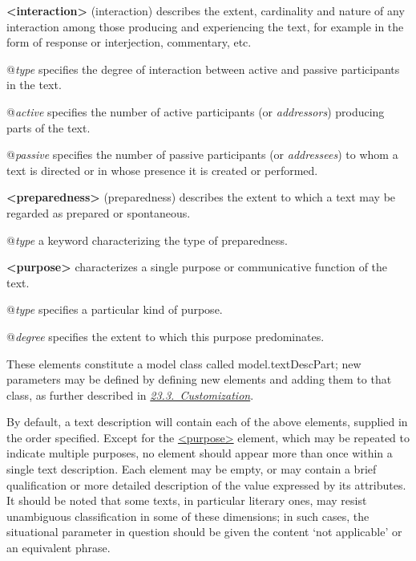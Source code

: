 \begin{sansreflist}
\item [\textbf{<interaction>}] (interaction) describes the extent, cardinality and nature of any interaction among those producing and experiencing the text, for example in the form of response or interjection, commentary, etc.\hfil\\[-10pt]\begin{sansreflist}
    \item[@{\itshape type}]
  specifies the degree of interaction between active and passive participants in the text.
    \item[@{\itshape active}]
  specifies the number of active participants (or \textit{addressors}) producing parts of the text.
    \item[@{\itshape passive}]
  specifies the number of passive participants (or \textit{addressees}) to whom a text is directed or in whose presence it is created or performed.
\end{sansreflist}  
\item [\textbf{<preparedness>}] (preparedness) describes the extent to which a text may be regarded as prepared or spontaneous.\hfil\\[-10pt]\begin{sansreflist}
    \item[@{\itshape type}]
  a keyword characterizing the type of preparedness.
\end{sansreflist}  
\item [\textbf{<purpose>}] characterizes a single purpose or communicative function of the text.\hfil\\[-10pt]\begin{sansreflist}
    \item[@{\itshape type}]
  specifies a particular kind of purpose.
    \item[@{\itshape degree}]
  specifies the extent to which this purpose predominates.
\end{sansreflist}  
\end{sansreflist}
\par
These elements constitute a model class called \textsf{model.textDescPart}; new parameters may be defined by defining new elements and adding them to that class, as further described in \textit{\hyperref[MD]{23.3.\ Customization}}.\par
By default, a text description will contain each of the above elements, supplied in the order specified. Except for the \hyperref[TEI.purpose]{<purpose>} element, which may be repeated to indicate multiple purposes, no element should appear more than once within a single text description. Each element may be empty, or may contain a brief qualification or more detailed description of the value expressed by its attributes. It should be noted that some texts, in particular literary ones, may resist unambiguous classification in some of these dimensions; in such cases, the situational parameter in question should be given the content ‘not applicable’ or an equivalent phrase.\par
